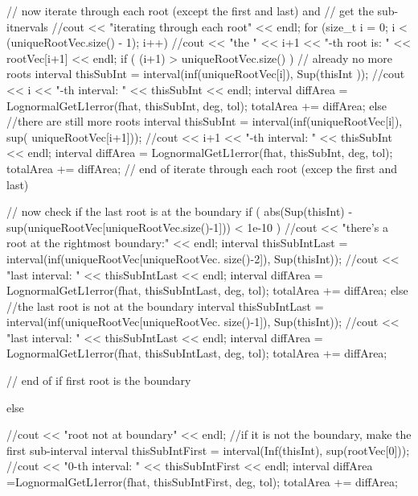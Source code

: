 \begin{DoxyCode}
{{{{{          // now iterate through each root (except the first and last) and 
          // get the sub-itnervals
          //cout << "iterating through each root" << endl;
          for (size_t i = 0; i < (uniqueRootVec.size() - 1); i++) {
            //cout << "the " << i+1 << "-th root is: " << rootVec[i+1] << endl;
            if ( (i+1) > uniqueRootVec.size() ) { // already no more roots
              interval thisSubInt = interval(inf(uniqueRootVec[i]), Sup(thisInt
      ));
              //cout << i << "-th interval: " << thisSubInt << endl;
              interval diffArea = LognormalGetL1error(fhat, thisSubInt, deg, 
      tol);
              totalArea += diffArea;
            }
            else { //there are still more roots
              interval thisSubInt = interval(inf(uniqueRootVec[i]), sup(
      uniqueRootVec[i+1]));
              //cout << i+1 << "-th interval: " << thisSubInt << endl;
              interval diffArea = LognormalGetL1error(fhat, thisSubInt, deg, 
      tol);
              totalArea += diffArea;
            }
          } // end of iterate through each root (excep the first and last)
          
          // now check if the last root is at the boundary
          if ( abs(Sup(thisInt) - sup(uniqueRootVec[uniqueRootVec.size()-1])) <
       1e-10 ) {
            //cout << "there's a root at the rightmost boundary:" << endl;
            interval thisSubIntLast = interval(inf(uniqueRootVec[uniqueRootVec.
      size()-2]), Sup(thisInt));
            //cout << "last interval: " << thisSubIntLast << endl; 
            interval diffArea = LognormalGetL1error(fhat, thisSubIntLast, deg, 
      tol);
            totalArea += diffArea;
          }
          else { //the last root is not at the boundary
            interval thisSubIntLast = interval(inf(uniqueRootVec[uniqueRootVec.
      size()-1]), Sup(thisInt));
            //cout << "last interval: " << thisSubIntLast << endl; 
            interval diffArea = LognormalGetL1error(fhat, thisSubIntLast, deg, 
      tol);
            totalArea += diffArea;
          } 
        } // end of if first root is the boundary
        
        else {
          //cout << "root not at boundary" << endl;
          //if it is not the boundary, make the first sub-interval
          interval thisSubIntFirst = interval(Inf(thisInt), sup(rootVec[0]));
          //cout << "0-th interval: " << thisSubIntFirst << endl; 
          interval diffArea =LognormalGetL1error(fhat, thisSubIntFirst, deg, 
      tol);
          totalArea += diffArea;
          
}}}}}
\end{DoxyCode}

